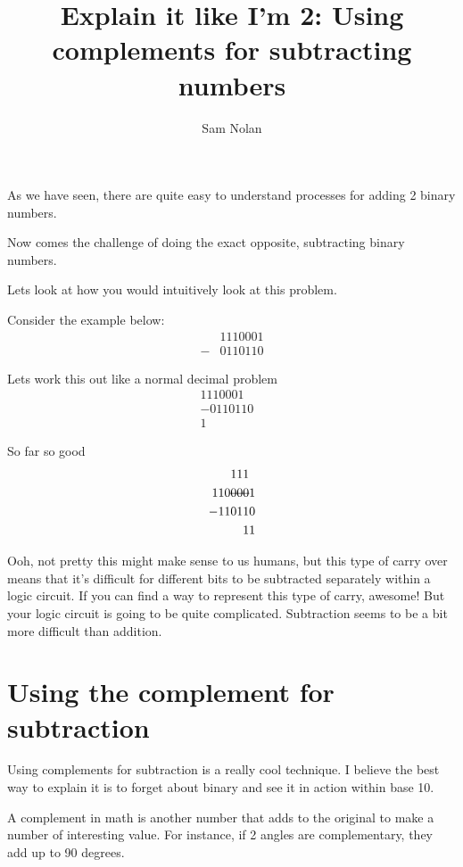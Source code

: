 \documentclass{article}
\author{Sam Nolan}
\title{Explain it like I'm 2: Using complements for subtracting numbers}
\begin{document}
  \maketitle

  As we have seen, there are quite easy to understand processes for adding 2 binary numbers.

  Now comes the challenge of doing the exact opposite, subtracting binary numbers.

  Lets look at how you would intuitively look at this problem.

  Consider the example below:
  \begin{align}
   &1110001 \nonumber \\
 - &0110110 \nonumber
  \end{align}

  Lets work this out like a normal decimal problem
  \begin{align}
     1110001& \nonumber \\
    -0110110& \nonumber \\
        1& \nonumber
  \end{align}
  
  So far so good
  \begin{align}
     111& \nonumber \\
    110\text{\sout{000}}&1 \nonumber \\ 
    - 11011&0 \nonumber \\
       1&1 \nonumber 
  \end{align}

  Ooh, not pretty this might make sense to us humans, but this type of carry over means that it's difficult
  for different bits to be subtracted separately within a logic circuit. If you can find a way
  to represent this type of carry, awesome! But your logic circuit is going to be quite complicated. 
  Subtraction seems to be a bit more difficult than addition.

  \section{Using the complement for subtraction}

  Using complements for subtraction is a really cool technique. I believe the best way to explain
  it is to forget about binary and see it in action within base 10.

  A complement in math is another number that adds to the original to make a number of interesting
  value. For instance, if 2 angles are complementary, they add up to 90 degrees.
\end{document}
